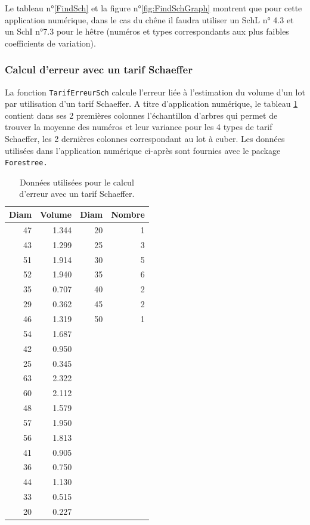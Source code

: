 \documentclass{article}\usepackage[]{graphicx}\usepackage[]{color}
\begin{document}
Le tableau n°\ref{FindSch} et la figure n°\ref{fig:FindSchGraph} montrent que pour cette application numérique, dans le cas du chêne il faudra utiliser un SchL n° 4.3 et un SchI n°7.3 pour le hêtre (numéros et types correspondants aux plus faibles coefficients de variation).


\subsubsection{Calcul d'erreur avec un tarif Schaeffer}\label{ParaErreurTarif}
La fonction \texttt{TarifErreurSch} calcule l'erreur liée à l'estimation du volume d'un lot par utilisation d'un tarif Schaeffer. A titre d'application numérique, le tableau \ref{DataErreurTarif} contient dans ses 2 premières colonnes l'échantillon d'arbres qui permet de trouver la moyenne des numéros et leur variance pour les 4 types de tarif Schaeffer, les 2 dernières colonnes correspondant au lot à cuber. Les données utilisées dans l'application numérique ci-après sont fournies avec le package \texttt{Forestree.}

\begin{table}[ht]
\centering
\begingroup\small
\begin{tabular}{rrrr}
  \hline
Diam & Volume & Diam & Nombre \\ 
  \hline
47 & 1.344 & 20 & 1 \\ 
  43 & 1.299 & 25 & 3 \\ 
  51 & 1.914 & 30 & 5 \\ 
  52 & 1.940 & 35 & 6 \\ 
  35 & 0.707 & 40 & 2 \\ 
  29 & 0.362 & 45 & 2 \\ 
  46 & 1.319 & 50 & 1 \\ 
  54 & 1.687 &  &  \\ 
  42 & 0.950 &  &  \\ 
  25 & 0.345 &  &  \\ 
  63 & 2.322 &  &  \\ 
  60 & 2.112 &  &  \\ 
  48 & 1.579 &  &  \\ 
  57 & 1.950 &  &  \\ 
  56 & 1.813 &  &  \\ 
  41 & 0.905 &  &  \\ 
  36 & 0.750 &  &  \\ 
  44 & 1.130 &  &  \\ 
  33 & 0.515 &  &  \\ 
  20 & 0.227 &  &  \\ 
   \hline
\end{tabular}
\endgroup
\caption{Données utilisées pour le calcul d'erreur avec un tarif Schaeffer.} 
\label{DataErreurTarif}
\end{table}
\end{document}
